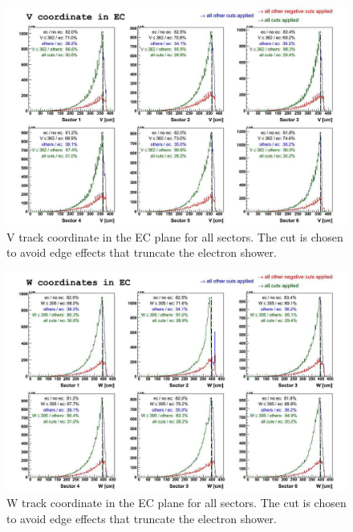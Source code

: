 \clearpage
\begin{landscape}
\begin{figure}[ht]
  \centering
		\includegraphics[width=1.35\textheight]{img/ECv_no_cuts_on_sect1_each_sector.jpg}
		\caption{V track coordinate in the EC plane for all sectors. The cut is chosen to avoid
              edge effects that truncate the electron shower.}
 		\label{fig:ECv}
\end{figure}
\end{landscape}

\clearpage
\begin{landscape}
\begin{figure}[ht]
  \centering
		\includegraphics[width=1.35\textheight]{img/ECw_no_cuts_on_sect1_each_sector.jpg}
		\caption{W track coordinate in the EC plane for all sectors. The cut is chosen to avoid
              edge effects that truncate the electron shower.}
 		\label{fig:ECw}
\end{figure}
\end{landscape}

